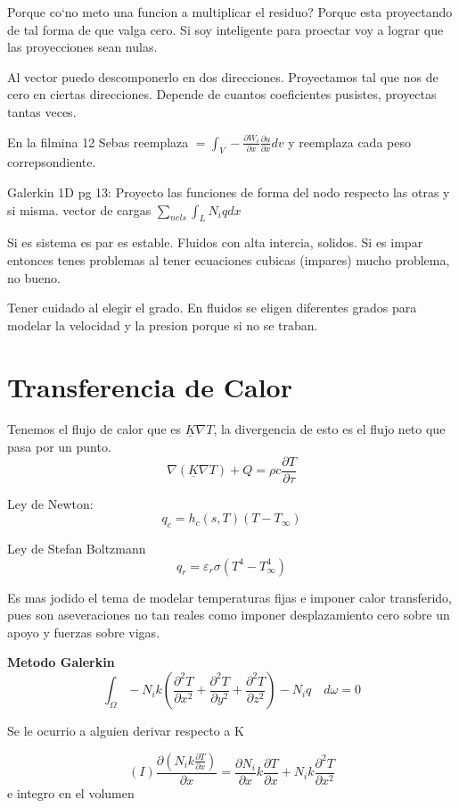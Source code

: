 \documentclass[11pt, a4paper,titlepage]{article}
\begin{document}
Porque co`no meto una funcion a multiplicar el residuo? Porque esta proyectando de tal forma de que valga cero. Si soy inteligente para proectar voy a lograr que las proyecciones sean nulas.

Al vector puedo descomponerlo en dos direcciones. Proyectamos tal que nos de cero en ciertas direcciones. Depende de cuantos coeficientes pusistes, proyectas tantas veces. 

En la filmina 12 Sebas reemplaza $=\int_{V}-\frac{\partial W_{i}}{\partial x} \frac{\partial u}{\partial x} d v$ y reemplaza cada peso correpsondiente.

Galerkin 1D pg 13: Proyecto las funciones de forma del nodo respecto las otras y si misma. vector de cargas $\sum_{n e l s} \int_{L} N_{i} q d x$

Si es sistema es par es estable. Fluidos con alta intercia, solidos. Si es impar entonces tenes problemas al tener ecuaciones cubicas (impares) mucho problema, no bueno.

Tener cuidado al elegir el grado. En fluidos se eligen diferentes grados para modelar la velocidad y la presion porque si no se traban. 


\section{Transferencia de Calor}

Tenemos el flujo de calor que es $\underline{K} \nabla T$, la divergencia de esto es el flujo neto que pasa por un punto.
\[
\nabla(\underline{K} \nabla T)+Q=\rho c \frac{\partial T}{\partial \tau}
\] 

Ley de Newton: 
\[
q_{c}=h_{c}(s, T)\left(T-T_{\infty}\right)
\]

Ley de Stefan Boltzmann
\[
q_{r}=\varepsilon_{r} \sigma\left(T^{4}-T_{\infty}^{4}\right)
\]

Es mas jodido el tema de modelar temperaturas fijas e imponer calor transferido, pues son aseveraciones no tan reales como imponer desplazamiento cero sobre un apoyo y  fuerzas sobre vigas.

\textbf{Metodo Galerkin}
\[
\int_{\Omega}-N_{i} k\left(\frac{\partial^{2} T}{\partial x^{2}}+\frac{\partial^{2} T}{\partial y^{2}}+\frac{\partial^{2} T}{\partial z^{2}}\right)-N_{i} q \quad d \omega=0
\]


Se le ocurrio a alguien derivar respecto a K 

\[
(I) \frac{\partial\left(N_{i} k \frac{\partial T}{\partial x}\right)}{\partial x}=\frac{\partial N_{i}}{\partial x} k \frac{\partial T}{\partial x}+N_{i} k \frac{\partial^{2} T}{\partial x^{2}}
\]
e integro en el volumen
\end{document}
